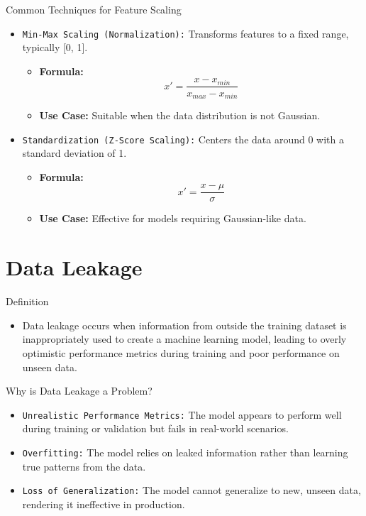 \documentclass[serif, aspectratio=169]{beamer}
\begin{document}
\begin{frame}{Common Techniques for Feature Scaling}
    \begin{itemize}
        \item \texttt{\color{teal}Min-Max Scaling (Normalization):} Transforms features to a fixed range, typically [0, 1].  
        \begin{itemize}
            \item \textbf{Formula:} 
            \[
            x' = \frac{x - x_{min}}{x_{max} - x_{min}}
            \]
            \item \textbf{Use Case:} Suitable when the data distribution is not Gaussian.
        \end{itemize}

        \item \texttt{\color{teal}Standardization (Z-Score Scaling):} Centers the data around 0 with a standard deviation of 1.  
        \begin{itemize}
            \item \textbf{Formula:} 
            \[
            x' = \frac{x - \mu}{\sigma}
            \]
            \item \textbf{Use Case:} Effective for models requiring Gaussian-like data.
        \end{itemize}
    \end{itemize}
\end{frame}

\section{Data Leakage}

\begin{frame}{Definition}
    \begin{itemize}
        \item Data leakage occurs when information from outside the training dataset is inappropriately used to create a machine learning model, leading to overly optimistic performance metrics during training and poor performance on unseen data.
    \end{itemize}
\end{frame}

\begin{frame}{Why is Data Leakage a Problem?}
    \begin{itemize}
        \item \texttt{\color{teal}Unrealistic Performance Metrics:} The model appears to perform well during training or validation but fails in real-world scenarios.
    
        \item \texttt{\color{teal}Overfitting:} The model relies on leaked information rather than learning true patterns from the data.
    
        \item \texttt{\color{teal}Loss of Generalization:} The model cannot generalize to new, unseen data, rendering it ineffective in production.
    \end{itemize}
\end{frame}
\end{document}
